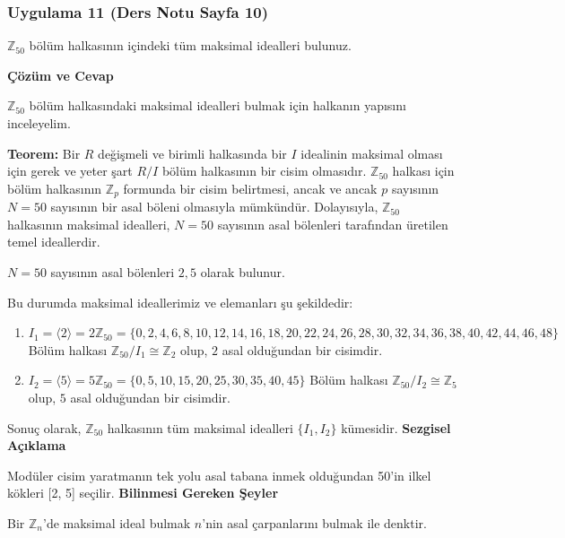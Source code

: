 \documentclass[11pt, a4paper]{article}
\newenvironment{cozum}{
    \vspace{0.5cm}
    \noindent\textcolor{green!60!black}{\faCheckCircle\enspace \textbf{\Large Çözüm ve Cevap}}\par\vspace{0.2cm}
}{}
\newenvironment{sezgisel}{
    \vspace{0.5cm}
    \noindent\textcolor{orange!80!black}{\faLightbulb\enspace \textbf{\Large Sezgisel Açıklama}}\par\vspace{0.2cm}
    \itshape
}{}
\newenvironment{bilgi}{
    \vspace{0.5cm}
    \noindent\textcolor{red!70!black}{\faExclamationTriangle\enspace \textbf{\Large Bilinmesi Gereken Şeyler}}\par\vspace{0.2cm}
}{}
\begin{document}
\subsubsection{Uygulama 11 (Ders Notu Sayfa 10)}
\begin{sorubox}
$\mathbb{Z}_{50}$ bölüm halkasının içindeki tüm maksimal idealleri bulunuz.
\end{sorubox}
\begin{cozum}
$\mathbb{Z}_{50}$ bölüm halkasındaki maksimal idealleri bulmak için halkanın yapısını inceleyelim.

\textbf{Teorem:} Bir $R$ değişmeli ve birimli halkasında bir $I$ idealinin maksimal olması için gerek ve yeter şart $R/I$ bölüm halkasının bir cisim olmasıdır. $\mathbb{Z}_{50}$ halkası için bölüm halkasının $\mathbb{Z}_p$ formunda bir cisim belirtmesi, ancak ve ancak $p$ sayısının $N = 50$ sayısının bir asal böleni olmasıyla mümkündür. Dolayısıyla, $\mathbb{Z}_{50}$ halkasının maksimal idealleri, $N = 50$ sayısının asal bölenleri tarafından üretilen temel ideallerdir.

$N = 50$ sayısının asal bölenleri $2, 5$ olarak bulunur.

Bu durumda maksimal ideallerimiz ve elemanları şu şekildedir:
\begin{enumerate}
    \item $I_{1} = \langle 2 \rangle = 2\mathbb{Z}_{50} = \{0, 2, 4, 6, 8, 10, 12, 14, 16, 18, 20, 22, 24, 26, 28, 30, 32, 34, 36, 38, 40, 42, 44, 46, 48\}$
    Bölüm halkası $\mathbb{Z}_{50} / I_{1} \cong \mathbb{Z}_{2}$ olup, $2$ asal olduğundan bir cisimdir.
    \item $I_{2} = \langle 5 \rangle = 5\mathbb{Z}_{50} = \{0, 5, 10, 15, 20, 25, 30, 35, 40, 45\}$
    Bölüm halkası $\mathbb{Z}_{50} / I_{2} \cong \mathbb{Z}_{5}$ olup, $5$ asal olduğundan bir cisimdir.
\end{enumerate}

Sonuç olarak, $\mathbb{Z}_{50}$ halkasının tüm maksimal idealleri $\{I_1, I_2\}$ kümesidir.
\end{cozum}
\begin{sezgisel}
Modüler cisim yaratmanın tek yolu asal tabana inmek olduğundan 50'in ilkel kökleri [2, 5] seçilir.
\end{sezgisel}
\begin{bilgi}
Bir $\mathbb{Z}_n$'de maksimal ideal bulmak $n$'nin asal çarpanlarını bulmak ile denktir.
\end{bilgi}

\newpage
\end{document}
